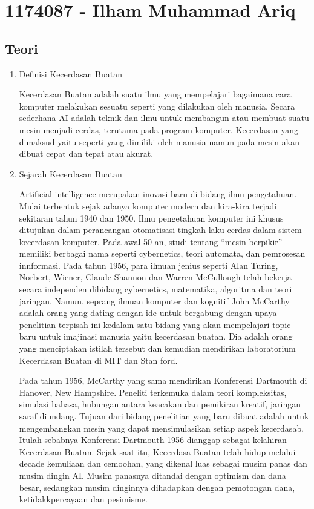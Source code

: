 \section{1174087 - Ilham Muhammad Ariq}
\subsection{Teori}
\begin{enumerate}
	\item Definisi Kecerdasan Buatan
		\par Kecerdasan Buatan adalah suatu ilmu yang mempelajari bagaimana cara komputer melakukan sesuatu seperti yang dilakukan oleh manusia. Secara sederhana AI adalah teknik dan ilmu untuk membangun atau membuat suatu mesin menjadi cerdas, terutama pada program komputer. Kecerdasan yang dimaksud yaitu seperti yang dimiliki oleh manusia namun pada mesin akan dibuat cepat dan tepat atau akurat.

	\item {Sejarah Kecerdasan Buatan}
    \par Artificial intelligence merupakan inovasi baru di bidang ilmu pengetahuan. Mulai terbentuk sejak adanya komputer modern dan kira-kira terjadi sekitaran tahun 1940 dan 1950. Ilmu pengetahuan komputer ini khusus ditujukan dalam perancangan otomatisasi tingkah laku cerdas dalam sistem kecerdasan komputer. Pada awal 50-an, studi tentang “mesin berpikir” memiliki berbagai nama seperti cybernetics, teori automata, dan pemrosesan innformasi. Pada tahun 1956, para ilmuan jenius seperti Alan Turing, Norbert, Wiener, Claude Shannon dan Warren McCullough telah bekerja secara independen dibidang cybernetics, matematika, algoritma dan teori jaringan. Namun, seprang ilmuan komputer dan kognitif John McCarthy adalah orang yang dating dengan ide untuk bergabung dengan upaya penelitian terpisah ini kedalam satu bidang yang akan mempelajari topic baru untuk imajinasi manusia yaitu kecerdasan buatan. Dia adalah orang yang menciptakan istilah tersebut dan kemudian mendirikan laboratorium Kecerdasan Buatan di MIT dan Stan ford.

    Pada tahun 1956, McCarthy yang sama mendirikan Konferensi Dartmouth di Hanover, New Hampshire. Peneliti terkemuka dalam teori kompleksitas, simulasi bahasa, hubungan antara keacakan dan pemikiran kreatif, jaringan saraf diundang. Tujuan dari bidang penelitian yang baru dibuat adalah untuk mengembangkan mesin yang dapat mensimulasikan setiap aspek kecerdasab. Itulah sebabnya Konferensi Dartmouth 1956 dianggap sebagai kelahiran Kecerdasan Buatan. Sejak saat itu, Kecerdasa Buatan telah hidup melalui decade kemuliaan dan cemoohan, yang dikenal luas sebagai musim panas dan musim dingin AI. Musim panasnya ditandai dengan optimism dan dana besar, sedangkan musim dinginnya dihadapkan dengan pemotongan dana, ketidakkpercayaan dan pesimisme.


\end{enumerate}
